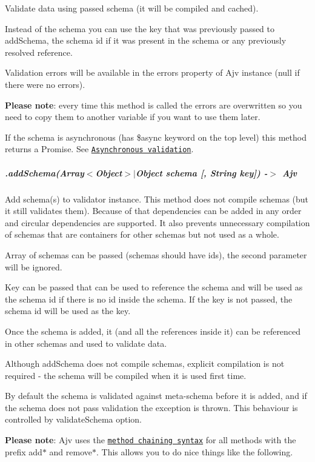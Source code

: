 Validate data using passed schema (it will be compiled and cached).

Instead of the schema you can use the key that was previously passed to {\ttfamily add\+Schema}, the schema id if it was present in the schema or any previously resolved reference.

Validation errors will be available in the {\ttfamily errors} property of Ajv instance ({\ttfamily null} if there were no errors).

{\bfseries Please note}\+: every time this method is called the errors are overwritten so you need to copy them to another variable if you want to use them later.

If the schema is asynchronous (has {\ttfamily \$async} keyword on the top level) this method returns a Promise. See \href{#asynchronous-validation}{\tt Asynchronous validation}.

\subparagraph*{.add\+Schema(Array$<$Object$>$$\vert$\+Object schema \mbox{[}, String key\mbox{]}) -\/$>$ Ajv}

Add schema(s) to validator instance. This method does not compile schemas (but it still validates them). Because of that dependencies can be added in any order and circular dependencies are supported. It also prevents unnecessary compilation of schemas that are containers for other schemas but not used as a whole.

Array of schemas can be passed (schemas should have ids), the second parameter will be ignored.

Key can be passed that can be used to reference the schema and will be used as the schema id if there is no id inside the schema. If the key is not passed, the schema id will be used as the key.

Once the schema is added, it (and all the references inside it) can be referenced in other schemas and used to validate data.

Although {\ttfamily add\+Schema} does not compile schemas, explicit compilation is not required -\/ the schema will be compiled when it is used first time.

By default the schema is validated against meta-\/schema before it is added, and if the schema does not pass validation the exception is thrown. This behaviour is controlled by {\ttfamily validate\+Schema} option.

{\bfseries Please note}\+: Ajv uses the \href{https://en.wikipedia.org/wiki/Method_chaining}{\tt method chaining syntax} for all methods with the prefix {\ttfamily add$\ast$} and {\ttfamily remove$\ast$}. This allows you to do nice things like the following.


